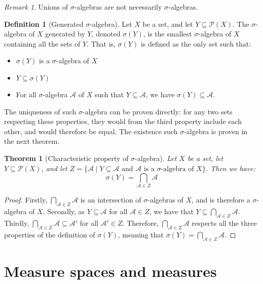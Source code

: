 \documentclass{article}
\newtheorem{theorem}{Theorem}[section]
\theoremstyle{definition}
\newtheorem{definition}{Definition}[section]
\theoremstyle{remark}
\newtheorem*{remark}{Remark}
\theoremstyle{example}
\begin{document}
\begin{remark}
    Unions of $\sigma$-algebras are not necessarily $\sigma$-algebras.
\end{remark}

\begin{definition}[Generated $\sigma$-algebra]
    Let $X$ be a set, and let $Y \subseteq \mathcal{P}(X)$. The $\sigma$-algebra of $X$ generated by $Y$, denoted $\sigma(Y)$, is the smallest $\sigma$-algebra of $X$ containing all the sets of $Y$. That is, $\sigma(Y)$ is defined as the only set such that:
    \begin{itemize}
        \item $\sigma(Y)$ is a $\sigma$-algebra of $X$
        \item $Y \subseteq \sigma(Y)$
        \item For all $\sigma$-algebra $\mathcal{A}$ of $X$ such that $Y \subseteq \mathcal{A}$, we have $\sigma(Y) \subseteq \mathcal{A}$.
    \end{itemize}
    The uniqueness of such $\sigma$-algebra can be proven directly: for any two sets respecting these properties, they would from the third property include each other, and would therefore be equal. The existence such $\sigma$-algebra is proven in the next theorem.
\end{definition}

\begin{theorem}[Characteristic property of $\sigma$-algebra]
    Let $X$ be a set, let $Y \subseteq \mathcal{P}(X)$, and let $Z = \{\mathcal{A} \mid \text{$Y \subseteq \mathcal{A}$ and $\mathcal{A}$ is a $\sigma$-algebra of $X$}\}$. Then we have:
        $$\sigma(Y) = \bigcap_{\mathcal{A} \in Z} \mathcal{A}$$
\end{theorem}

\begin{proof}
    Firstly, $\bigcap_{\mathcal{A} \in Z} \mathcal{A}$ is an intersection of $\sigma$-algebras of $X$, and is therefore a $\sigma$-algebra of $X$. Secondly, as $Y \subseteq \mathcal{A}$ for all $\mathcal{A} \in Z$, we have that $Y \subseteq \bigcap_{\mathcal{A} \in Z} \mathcal{A}$. Thirdly, $\bigcap_{\mathcal{A} \in Z} \mathcal{A} \subseteq \mathcal{A}'$ for all $\mathcal{A}' \in Z$. Therefore, $\bigcap_{\mathcal{A} \in Z} \mathcal{A}$ respects all the three properties of the definition of $\sigma(Y)$, meaning that $\sigma(Y) = \bigcap_{\mathcal{A} \in Z} \mathcal{A}$.
\end{proof}


\section{Measure spaces and measures}
\end{document}
